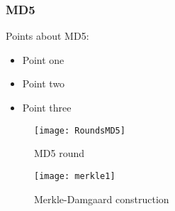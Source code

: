 \begin{frame}
  \frametitle{MD5}
  \begin{minipage}[t]{0.45\linewidth}
    Points about MD5:
    \begin{itemize}
    \item Point one
    \item Point two
    \item Point three
    \end{itemize}
  \end{minipage}\hfill
  \begin{minipage}[t][3cm][c]{0.5\linewidth}
    \centering
    \begin{figure}
      \centering
      \texttt{[image: RoundsMD5]}
      \caption{MD5 round}
    \end{figure}
  \end{minipage}

  \begin{minipage}[b][4cm][b]{0.9\linewidth}
  \begin{figure}
    \centering
    \texttt{[image: merkle1]}
    \caption{Merkle-Damgaard construction}
  \end{figure}
  \end{minipage}

\end{frame}

